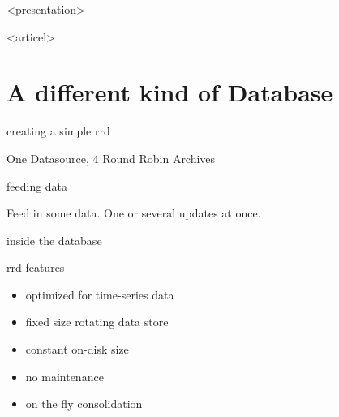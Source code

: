 
\begin{frame}<presentation>
  \titlepage
\end{frame}

\mode<articel>{\tableofcontents}

\section{A different kind of Database}

\begin{frame}{creating a simple rrd}

One Datasource, 4 Round Robin Archives
\end{frame}

\begin{frame}{feeding data}

Feed in some data. One or several updates at once.
\end{frame}

\begin{frame}[allowframebreaks]{inside the database}

\end{frame}


\begin{frame}{rrd features}
\begin{itemize}[<+-| alert@+>]
\item optimized for time-series data
\item fixed size rotating data store
\item constant on-disk size
\item no maintenance
\item on the fly consolidation
\end{itemize}
\end{frame}

